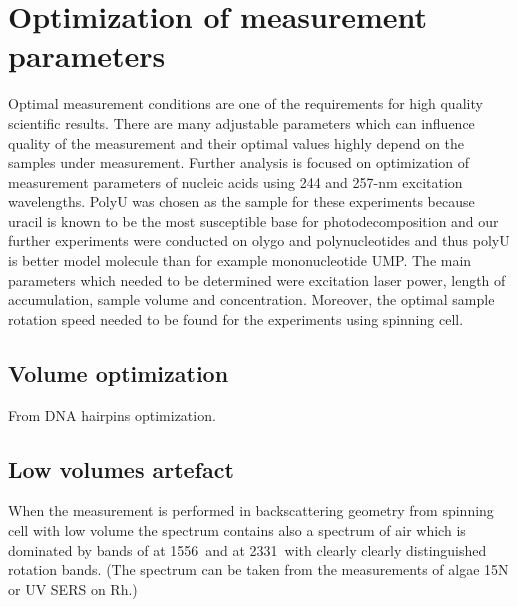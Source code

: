 \section{Optimization of measurement parameters}

Optimal measurement conditions are one of the requirements for high quality
scientific results. There are many adjustable parameters which can influence
quality of the measurement and their optimal values highly depend on the
samples under measurement. Further analysis is focused on optimization of
measurement parameters of nucleic acids using 244 and 257-nm excitation
wavelengths. PolyU was chosen as the sample for these experiments because
uracil is known to be the most susceptible base for photodecomposition and our
further experiments were conducted on olygo and polynucleotides and thus polyU
is better model molecule than for example mononucleotide UMP. The main
parameters which needed to be determined were excitation laser power, length of
accumulation, sample volume and concentration. Moreover, the optimal sample
rotation speed needed to be found for the experiments using spinning cell.




\subsection{Volume optimization}
From DNA hairpins optimization.





\subsection{Low volumes artefact}
When the measurement is performed in backscattering geometry from spinning cell
with low volume the spectrum contains also a spectrum of air which is dominated
by bands of  at 1556\,\icm{} and  at 2331\,\icm{} with clearly
clearly distinguished rotation bands. (The spectrum can be taken from the
measurements of algae 15N or UV SERS on Rh.)
